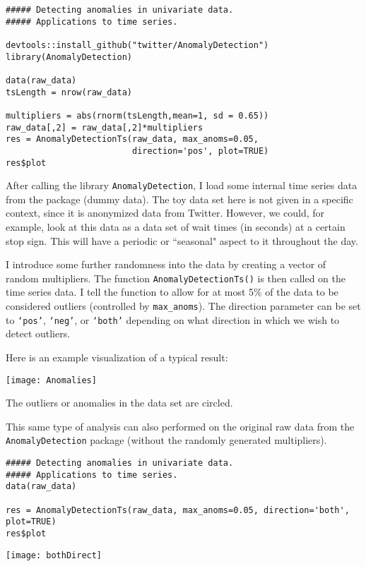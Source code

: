 \documentclass[12pt]{article}
\begin{document}
\begin{lstlisting}
##### Detecting anomalies in univariate data. 
##### Applications to time series. 

devtools::install_github("twitter/AnomalyDetection")
library(AnomalyDetection)

data(raw_data)
tsLength = nrow(raw_data) 

multipliers = abs(rnorm(tsLength,mean=1, sd = 0.65))
raw_data[,2] = raw_data[,2]*multipliers 
res = AnomalyDetectionTs(raw_data, max_anoms=0.05, 
                         direction='pos', plot=TRUE)
res$plot
\end{lstlisting}

After calling the library \texttt{AnomalyDetection}, I load some internal time series data from the package (dummy data). The toy data set here is not given in a specific context, since it is anonymized data from Twitter. However, we could, for example, look at this data as a data set of wait times (in seconds) at a certain stop sign. This will have a periodic or ``seasonal" aspect to it throughout the day. 

I introduce some further randomness into the data by creating a vector of random multipliers. The function \texttt{AnomalyDetectionTs()} is then called on the time series data. I tell the function to allow for at most 5\% of the data to be considered outliers (controlled by \texttt{max\_anoms}). The direction parameter can be set to \texttt{`pos'}, \texttt{`neg'}, or \texttt{`both'} depending on what direction in which we wish to detect outliers. 

Here is an example visualization of a typical result:
\begin{center}
\texttt{[image: Anomalies]}
\end{center}
The outliers or anomalies in the data set are circled. 

This same type of analysis can also performed on the original raw data from the \texttt{AnomalyDetection} package (without the randomly generated multipliers).

 \begin{lstlisting}
##### Detecting anomalies in univariate data. 
##### Applications to time series. 
data(raw_data)

res = AnomalyDetectionTs(raw_data, max_anoms=0.05, direction='both', plot=TRUE)
res$plot
\end{lstlisting}

\begin{center}
\texttt{[image: bothDirect]}
\end{center}
\end{document}

